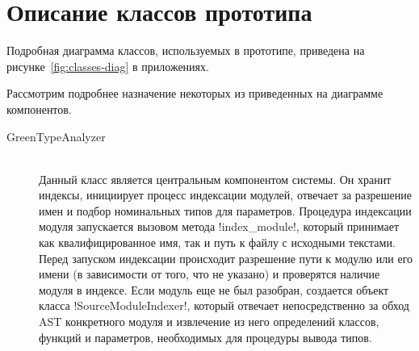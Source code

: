 \section{Описание классов прототипа}
\label{sec:classes-description}

Подробная диаграмма классов, используемых в прототипе, приведена на
 рисунке~\ref{fig:classes-diag} в приложениях.

Рассмотрим подробнее назначение некоторых из приведенных на диаграмме компонентов.

\begin{description}
  \item[GreenTypeAnalyzer] \hfill \\
    Данный класс является центральным компонентом системы. Он хранит индексы,
    инициирует процесс индексации модулей, отвечает за разрешение имен и подбор
    номинальных типов для параметров. Процедура индексации модуля запускается
    вызовом метода !index_module!, который принимает как квалифицированное имя,
    так и путь к файлу с исходными текстами. Перед запуском индексации
    происходит разрешение пути к модулю или его имени (в зависимости от того, что
    не указано) и проверятся наличие модуля в индексе. Если модуль еще не был
    разобран, создается объект класса !SourceModuleIndexer!, который отвечает
    непосредственно за обход AST конкретного модуля и извлечение из него
    определений классов, функций и параметров, необходимых для процедуры вывода
    типов.


\end{description}

